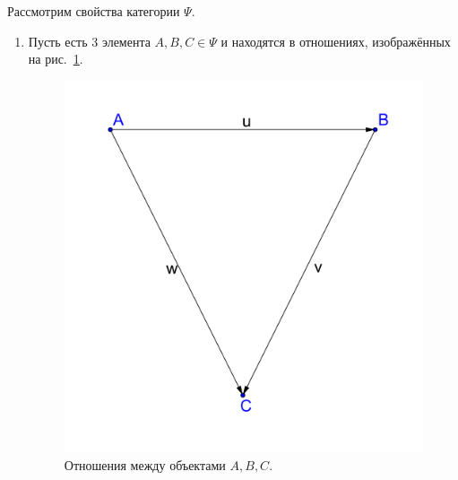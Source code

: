 \documentclass[a4paper, 12pt]{report}
\begin{document}
Рассмотрим свойства категории $\Psi$.
\begin{enumerate}
  \item Пусть есть 3 элемента $A, B, C \in \Psi$ и находятся в отношениях, изображённых на рис.~\ref{fig::property_1}.
      \begin{figure}[!htbp]
        \begin{center}
            \includegraphics[width=0.3\linewidth]{lect5/Properity1pic1.png}
        \end{center}
        \caption{Отношения между объектами $A,B,C$.}
        \label{fig::property_1}
      \end{figure}
      

\end{enumerate}
\end{document}
